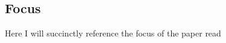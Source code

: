 \documentclass{Paper_Summary}
\begin{document}
\maketitle

\breakline

\begin{center}
    \section*{Focus}
    Here I will succinctly reference the focus of the paper read
\end{center}

\breakline
\end{document}
